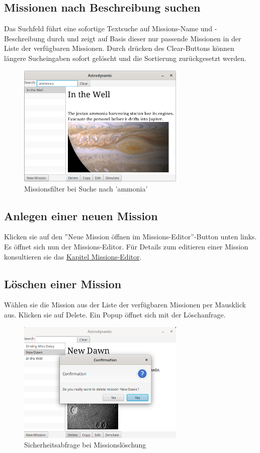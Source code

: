 \subsection{Missionen nach Beschreibung suchen}
Das Suchfeld führt eine sofortige Textsuche auf Missions-Name und -Beschreibung durch und zeigt auf Basis dieser nur passende Missionen in der Liste der verfügbaren Missionen. Durch drücken des Clear-Buttons können längere Sucheingaben sofort gelöscht und die Sortierung zurückgesetzt werden.

\begin{figure}[h]
	\centering
	\includegraphics[width=8cm]{res/search.png}
	\caption{Missionsfilter bei Suche nach 'ammonia'}
\end{figure}

\subsection{Anlegen einer neuen Mission}
Klicken sie auf den ''Neue Mission öffnen im Missions-Editor''-Button unten links.
Es öffnet sich nun der Missions-Editor.
Für Details zum editieren einer Mission konsultieren sie das \hyperlink{missioneditor}{Kapitel Missions-Editor}.

\subsection{Löschen einer Mission}
Wählen sie die Mission aus der Liste der verfügbaren Missionen per Mausklick aus.
Klicken sie auf Delete.
Ein Popup öffnet sich mit der Löschanfrage.

\begin{figure}[H]
	\centering
	\includegraphics[width=8cm]{res/loeschen.png}
	\caption{Sicherheitsabfrage bei Missionslöschung}
\end{figure}

